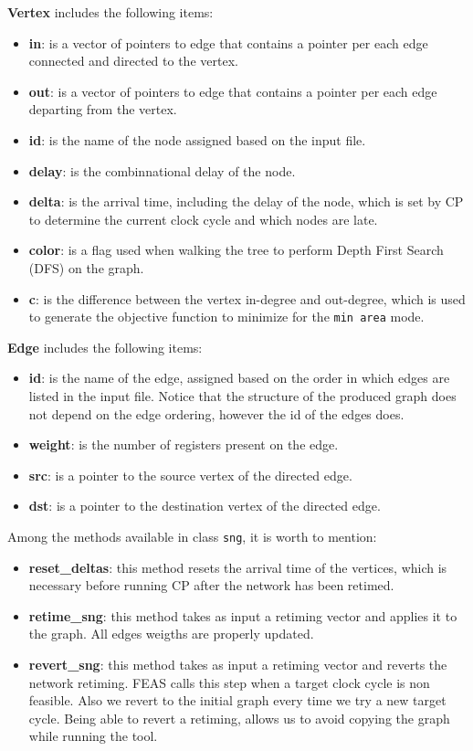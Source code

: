 \documentclass{acm_proc_article-sp}
\begin{document}
{\bf Vertex} includes the following items:
\begin{itemize}
  \item {\bf in}: is a vector of pointers to edge that contains a pointer per
    each edge connected and directed to the vertex.
  \item {\bf out}: is a vector of pointers to edge that contains a pointer per
    each edge departing from the vertex.
  \item {\bf id}: is the name of the node assigned based on the input file.
  \item {\bf delay}: is the combinnational delay of the node.
  \item {\bf delta}: is the arrival time, including the delay of the node,
    which is set by CP to determine the current clock cycle and which nodes
    are late.
  \item {\bf color}: is a flag used when walking the tree to perform Depth
    First Search (DFS) on the graph.
  \item {\bf c}: is the difference between the vertex in-degree and out-degree,
    which is used to generate the objective function to minimize for the
    \texttt{min area} mode.
\end{itemize}

{\bf Edge} includes the following items:
\begin{itemize}
  \item {\bf id}: is the name of the edge, assigned based on the order in which
    edges are listed in the input file. Notice that the structure of the
    produced graph does not depend on the edge ordering, however the id of the
    edges does.
    \item {\bf weight}: is the number of registers present on the edge.
    \item {\bf src}: is a pointer to the source vertex of the directed edge.
    \item {\bf dst}: is a pointer to the destination vertex of the directed
      edge.
\end{itemize}

Among the methods available in class \texttt{sng}, it is worth to mention:
\begin {itemize}
  \item {\bf reset\_deltas}: this method resets the arrival time of the
    vertices, which is necessary before running CP after the network has
    been retimed.
  \item {\bf retime\_sng}: this method takes as input a retiming vector
    and applies it to the graph. All edges weigths are properly updated.
  \item {\bf revert\_sng}: this method takes as input a retiming vector
    and reverts the network retiming.
    FEAS calls this step when a target clock cycle is non feasible. Also
    we revert to the initial graph every time we try a new target cycle.
    Being able to revert a retiming, allows us to avoid copying the graph
    while running the tool.
\end {itemize}
\end{document}
